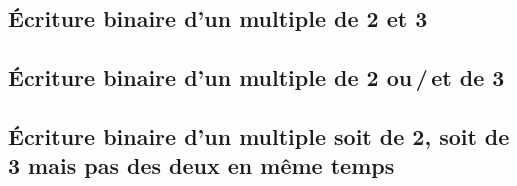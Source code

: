 \subsection{Écriture binaire d'un multiple de 2 et 3}

	


\newpage
\subsection{Écriture binaire d'un multiple de 2 ou\,/\,et de 3}

	



\newpage
\subsection{Écriture binaire d'un multiple soit de 2, soit de 3 mais pas des deux en même temps}

	
